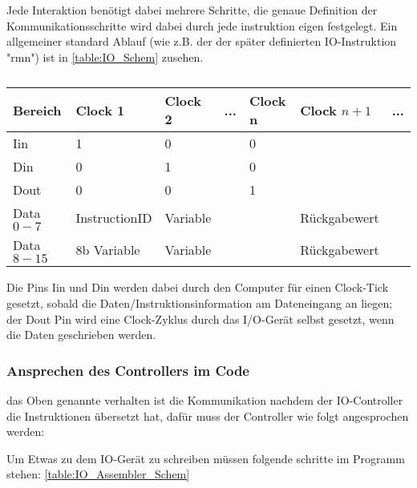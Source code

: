 \documentclass{scrartcl}
\begin{document}
Jede Interaktion benötigt dabei mehrere Schritte, die genaue Definition der Kommunikationsschritte wird dabei durch jede instruktion eigen festgelegt.
Ein allgemeiner standard Ablauf (wie z.B. der der später definierten IO-Instruktion "rmn") ist in \autoref{table:IO_Schem} zusehen.

\begin{center}
	\begin{table}[h]
		\caption{\label{table:IO_Schem}}
		\begin{tabular}{l | l | l | l | l | l | l}
			 Bereich & Clock 1 & Clock 2 & ... & Clock n & Clock $n+1$ & ... \\
			\hline
			Iin & 1 & 0 &   & 0 & \\
			Din & 0 & 1 &   & 0 & \\
			Dout & 0 & 0 &   & 1 & \\
			Data$0-7$ & InstructionID & Variable &   &   & Rückgabewert \\
			Data$8-15$ & 8b Variable & Variable &   &   & Rückgabewert
 		\end{tabular}
	\end{table}
\end{center}

Die Pins Iin und Din werden dabei durch den Computer für einen Clock-Tick gesetzt, sobald die Daten/Instruktionsinformation am Dateneingang an liegen;
der Dout Pin wird eine Clock-Zyklus durch das I/O-Gerät selbst gesetzt, wenn die Daten geschrieben werden.

\subsubsection{\label{section:IO-Instructions}Ansprechen des Controllers im Code}
das Oben genannte verhalten ist die Kommunikation nachdem der IO-Controller die Instruktionen übersetzt hat, dafür muss der Controller wie folgt angesprochen werden:

Um Etwas zu dem IO-Gerät zu schreiben müssen folgende schritte im Programm stehen: \autoref{table:IO_Assembler_Schem}
\end{document}
